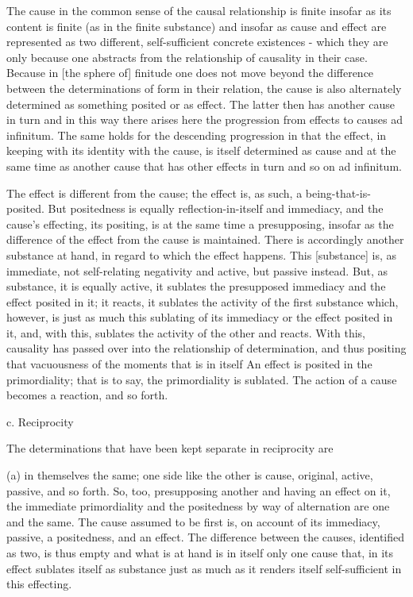     The cause in the common sense of the causal relationship is finite
    insofar as its content is finite (as in the finite substance) and insofar
    as cause and effect are represented as two different, self-sufficient
    concrete existences - which they are only because one abstracts from
    the relationship of causality in their case. Because in [the sphere
    of] finitude one does not move beyond the difference between the
    determinations of form in their relation, the cause is also alternately
    determined as something posited or as effect. The latter then has
    another cause in turn and in this way there arises here the
    progression from effects to causes ad infinitum. The same holds for
    the descending progression in that the effect, in keeping with its
    identity with the cause, is itself determined as cause and at the same
    time as another cause that has other effects in turn and so on ad
    infinitum.

The effect is different from the cause;
the effect is, as such, a being-that-is-posited.
But positedness is equally reflection-in-itself and immediacy, and
the cause's effecting, its positing, is at the same time a presupposing,
insofar as the difference of the effect from the cause is maintained.
There is accordingly another substance at hand,
in regard to which the effect happens.
This [substance] is, as immediate,
not self-relating negativity and active, but passive instead.
But, as substance, it is equally active,
it sublates the presupposed immediacy and the effect posited in it;
it reacts, it sublates the activity of the first substance which, however, is
just as much this sublating of its immediacy or
the effect posited in it, and, with this,
sublates the activity of the other and reacts.
With this, causality has passed over into the relationship of determination,
and thus positing that vacuousness of the moments that is in itself
An effect is posited in the primordiality;
that is to say, the primordiality is sublated.
The action of a cause becomes a reaction, and so forth.

c. Reciprocity

The determinations that have been kept separate in reciprocity are

(a) in themselves the same;
one side like the other is cause, original, active, passive, and so forth.
So, too, presupposing another and having an effect on it,
the immediate primordiality and the positedness
by way of alternation are one and the same.
The cause assumed to be first is,
on account of its immediacy,
 passive, a positedness, and an effect.
The difference between the causes, identified as two,
is thus empty and what is at hand is
in itself only one cause that, in its effect sublates itself
as substance just as much as it renders itself
self-sufficient in this effecting.

